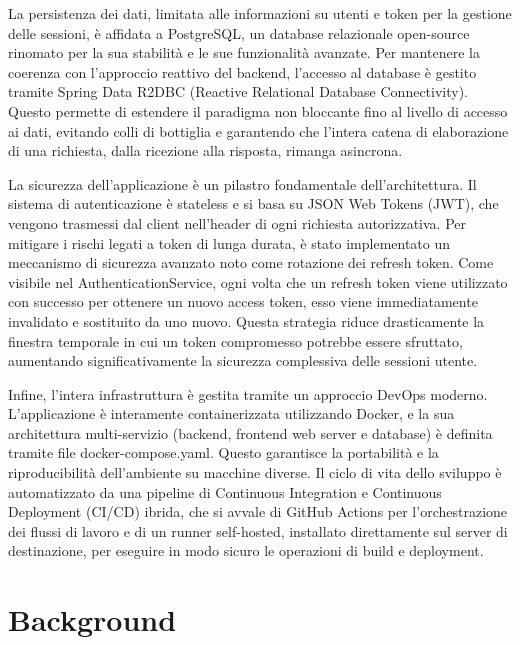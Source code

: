 \documentclass[12pt,a4paper,openright,twoside]{book}
\begin{document}
La persistenza dei dati, limitata alle informazioni su utenti e token per la gestione delle sessioni, è affidata a PostgreSQL, un database relazionale open-source rinomato per la sua stabilità e le sue funzionalità avanzate. Per mantenere la coerenza con l'approccio reattivo del backend, l'accesso al database è gestito tramite Spring Data R2DBC (Reactive Relational Database Connectivity). Questo permette di estendere il paradigma non bloccante fino al livello di accesso ai dati, evitando colli di bottiglia e garantendo che l'intera catena di elaborazione di una richiesta, dalla ricezione alla risposta, rimanga asincrona.

La sicurezza dell'applicazione è un pilastro fondamentale dell'architettura. Il sistema di autenticazione è stateless e si basa su JSON Web Tokens (JWT), che vengono trasmessi dal client nell'header di ogni richiesta autorizzativa. Per mitigare i rischi legati a token di lunga durata, è stato implementato un meccanismo di sicurezza avanzato noto come rotazione dei refresh token. Come visibile nel AuthenticationService, ogni volta che un refresh token viene utilizzato con successo per ottenere un nuovo access token, esso viene immediatamente invalidato e sostituito da uno nuovo. Questa strategia riduce drasticamente la finestra temporale in cui un token compromesso potrebbe essere sfruttato, aumentando significativamente la sicurezza complessiva delle sessioni utente.

Infine, l'intera infrastruttura è gestita tramite un approccio DevOps moderno. L'applicazione è interamente containerizzata utilizzando Docker, e la sua architettura multi-servizio (backend, frontend web server e database) è definita tramite file docker-compose.yaml. Questo garantisce la portabilità e la riproducibilità dell'ambiente su macchine diverse. Il ciclo di vita dello sviluppo è automatizzato da una pipeline di Continuous Integration e Continuous Deployment (CI/CD) ibrida, che si avvale di GitHub Actions per l'orchestrazione dei flussi di lavoro e di un runner self-hosted, installato direttamente sul server di destinazione, per eseguire in modo sicuro le operazioni di build e deployment.

\chapter{Background}
\label{chap:background}


\end{document}
